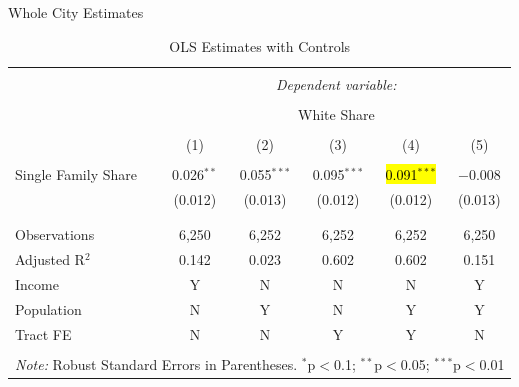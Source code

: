 \documentclass{beamer}
\makeatletter
\let\HL\hl
\renewcommand\hl{%
  \let\set@color\beamerorig@set@color
  \let\reset@color\beamerorig@reset@color
  \HL}
\makeatother
\begin{document}
\begin{frame}{Whole City Estimates}
    \tiny
    \begin{table}[!htbp] \centering 
  \caption{OLS Estimates with Controls} 
  \label{tab:OLS_controls} 
\begin{tabular}{@{\extracolsep{5pt}}lccccc} 
\\[-1.8ex]\hline 
\hline \\[-1.8ex] 
 & \multicolumn{5}{c}{\textit{Dependent variable:}} \\ 
\cline{2-6} 
\\[-1.8ex] & \multicolumn{5}{c}{White Share} \\ 
\\[-1.8ex] & (1) & (2) & (3) & (4) & (5)\\ 
\hline \\[-1.8ex] 
     Single Family Share & 0.026$^{**}$ & 0.055$^{***}$ & 0.095$^{***}$ & \hl{0.091$^{***}$} & $-$0.008 \\ 
  & (0.012) & (0.013) & (0.012) & (0.012) & (0.013) \\ 
  & & & & & \\ 
\hline \\[-1.8ex] 
Observations & 6,250 & 6,252 & 6,252 & 6,252 & 6,250 \\ 
Adjusted R$^{2}$ & 0.142 & 0.023 & 0.602 & 0.602 & 0.151 \\ 
\hline
Income & Y & N & N & N & Y\\
Population & N & Y & N & Y & Y\\
Tract FE & N & N & Y & Y & N\\
\hline 
\hline \\[-1.8ex] 
\multicolumn{6}{l}{\textit{Note:} Robust Standard Errors in Parentheses. $^{*}$p$<$0.1; $^{**}$p$<$0.05; $^{***}$p$<$0.01} \\ 
\end{tabular} 
\end{table}
\end{frame}
\end{document}
